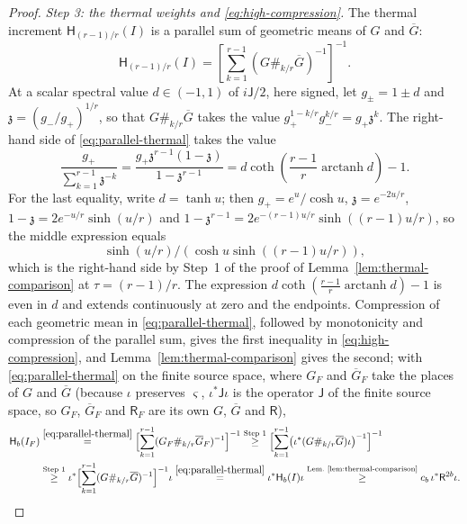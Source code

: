 \documentclass[11pt]{amsart}
\numberwithin{equation}{section}
\theoremstyle{definition}
\newcommand{\Res}{\mathsf R}
\newcommand{\Therm}{\mathsf H}
\newcommand{\arctanh}{\operatorname{arctanh}}
\begin{document}
\begin{proof}
\smallskip
\emph{Step 3: the thermal weights and \eqref{eq:high-compression}.}
The thermal increment \(\Therm_{(r-1)/r}(I)\) is a parallel sum of
geometric means of \(G\) and \(\overline G\):
\begin{equation}
 \Therm_{(r-1)/r}(I)
 =
 \left[\sum_{k=1}^{r-1}
       (G\#_{k/r}\overline G)^{-1}\right]^{-1}.
 \label{eq:parallel-thermal}
\end{equation}
At a scalar spectral value \(d\in(-1,1)\) of \(i\mathsf J/2\), here
signed, let
\(g_\pm=1\pm d\) and \(\mathfrak z=(g_-/g_+)^{1/r}\), so that
\(G\#_{k/r}\overline G\) takes the value
\(g_+^{1-k/r}g_-^{k/r}=g_+\mathfrak z^k\). The right-hand side of
\eqref{eq:parallel-thermal} takes the value
\[
 \frac{g_+}{\sum_{k=1}^{r-1}\mathfrak z^{-k}}
 =\frac{g_+\mathfrak z^{r-1}(1-\mathfrak z)}{1-\mathfrak z^{r-1}}
 =d\coth\!\left(\frac{r-1}{r}\arctanh d\right)-1.
\]
For the last equality, write \(d=\tanh u\); then
\(g_+=e^u/{\cosh u}\), \(\mathfrak z=e^{-2u/r}\),
\(1-\mathfrak z=2e^{-u/r}\sinh(u/r)\) and
\(1-\mathfrak z^{r-1}=2e^{-(r-1)u/r}\sinh((r-1)u/r)\), so the middle
expression equals
\[
 \sinh(u/r)/(\cosh u\sinh((r-1)u/r)),
\]
which is
the right-hand side by Step~1 of the proof of
Lemma~\ref{lem:thermal-comparison} at \(\tau=(r-1)/r\). The expression
\(d\coth(\frac{r-1}r\arctanh d)-1\) is even in \(d\) and extends
continuously at zero and the endpoints. Compression of each geometric
mean in \eqref{eq:parallel-thermal}, followed by monotonicity and
compression of the parallel sum, gives the first inequality in
\eqref{eq:high-compression}, and Lemma~\ref{lem:thermal-comparison}
gives the second; with \eqref{eq:parallel-thermal} on the finite
source space, where \(G_F\) and \(\overline G_F\) take the places of
\(G\) and \(\overline G\) (because \(\iota\) preserves \(\varsigma\),
\(\iota^*\mathsf J\iota\) is the operator \(\mathsf J\) of the finite source
space, so \(G_F\), \(\overline G_F\) and \(\Res_F\) are its own \(G\),
\(\overline G\) and \(\Res\)),
\begin{align*}
 \Therm_b(I_F)
 &\overset{\eqref{eq:parallel-thermal}}{=}
 \Bigl[\sum_{k=1}^{r-1}(G_F\#_{k/r}\overline G_F)^{-1}\Bigr]^{-1}
 \overset{\text{Step 1}}{\ge}
 \Bigl[\sum_{k=1}^{r-1}
  \bigl(\iota^*(G\#_{k/r}\overline G)\iota\bigr)^{-1}\Bigr]^{-1}\\
 &\overset{\text{Step 1}}{\ge}
 \iota^*\Bigl[\sum_{k=1}^{r-1}(G\#_{k/r}\overline G)^{-1}\Bigr]^{-1}\iota
 \overset{\eqref{eq:parallel-thermal}}{=}\iota^*\Therm_b(I)\iota
 \overset{\text{Lem.~\ref{lem:thermal-comparison}}}{\ge}
 c_b\,\iota^*\Res^{2b}\iota.
\end{align*}


\end{proof}
\end{document}
